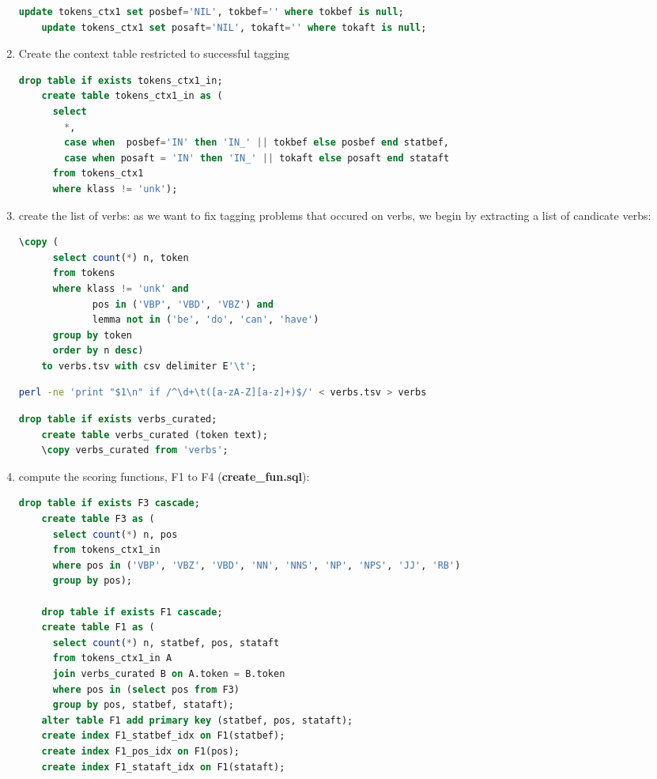 \documentclass[a4paper,11pt]{report}
\newcommand{\cs}[1]{{\bfseries \ttfamily #1}}
\begin{document}
\begin{enumerate}
\begin{lstlisting}[language=SQL]
    update tokens_ctx1 set posbef='NIL', tokbef='' where tokbef is null;
    update tokens_ctx1 set posaft='NIL', tokaft='' where tokaft is null;
  \end{lstlisting}
\item Create the context table restricted to successful tagging
  \begin{lstlisting}[language=SQL]
    drop table if exists tokens_ctx1_in;
    create table tokens_ctx1_in as (
      select
        *,
        case when  posbef='IN' then 'IN_' || tokbef else posbef end statbef,
        case when posaft = 'IN' then 'IN_' || tokaft else posaft end stataft
      from tokens_ctx1
      where klass != 'unk');
  \end{lstlisting}
\item create the list of verbs: as we want to fix tagging problems that occured on verbs, we begin by extracting a list of candicate verbs:
  \begin{lstlisting}[language=SQL]
    \copy (
      select count(*) n, token
      from tokens
      where klass != 'unk' and
             pos in ('VBP', 'VBD', 'VBZ') and
             lemma not in ('be', 'do', 'can', 'have')
      group by token
      order by n desc)
    to verbs.tsv with csv delimiter E'\t';
  \end{lstlisting}
  \begin{lstlisting}[language=bash]
    perl -ne 'print "$1\n" if /^\d+\t([a-zA-Z][a-z]+)$/' < verbs.tsv > verbs
  \end{lstlisting}
  \begin{lstlisting}[language=SQL]
    drop table if exists verbs_curated;
    create table verbs_curated (token text);
    \copy verbs_curated from 'verbs';
  \end{lstlisting}
\item compute the scoring functions, F1 to F4 (\cs{create\_fun.sql}):
  \begin{lstlisting}[language=SQL]
    drop table if exists F3 cascade;
    create table F3 as (
      select count(*) n, pos
      from tokens_ctx1_in
      where pos in ('VBP', 'VBZ', 'VBD', 'NN', 'NNS', 'NP', 'NPS', 'JJ', 'RB')
      group by pos);

    drop table if exists F1 cascade;
    create table F1 as (
      select count(*) n, statbef, pos, stataft
      from tokens_ctx1_in A
      join verbs_curated B on A.token = B.token
      where pos in (select pos from F3)
      group by pos, statbef, stataft);
    alter table F1 add primary key (statbef, pos, stataft);
    create index F1_statbef_idx on F1(statbef);
    create index F1_pos_idx on F1(pos);
    create index F1_stataft_idx on F1(stataft);


\end{lstlisting}
\end{enumerate}
\end{document}
